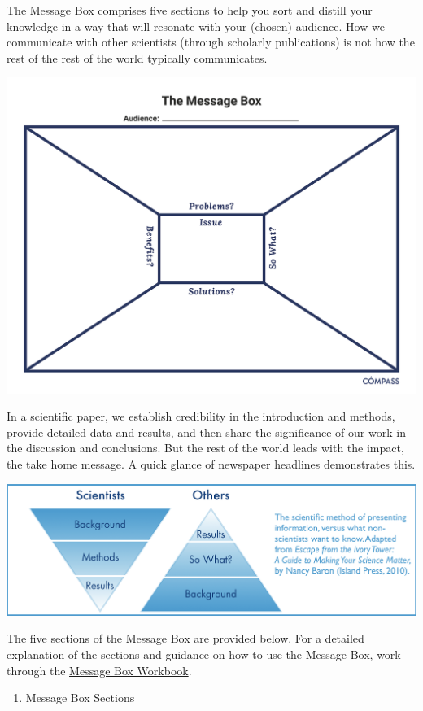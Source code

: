 \documentclass[
]{book}
\providecommand{\tightlist}{%
  \setlength{\itemsep}{0pt}\setlength{\parskip}{0pt}}
\begin{document}
The Message Box comprises five sections to help you sort and distill your knowledge in a way that will resonate with your (chosen) audience. How we communicate with other scientists (through scholarly publications) is not how the rest of the rest of the world typically communicates.

\includegraphics{images/message-box-blank.png}

In a scientific paper, we establish credibility in the introduction and methods, provide detailed data and results, and then share the significance of our work in the discussion and conclusions. But the rest of the world leads with the impact, the take home message. A quick glance of newspaper headlines demonstrates this.

\includegraphics{images/Communication.png}

The five sections of the Message Box are provided below. For a detailed explanation of the sections and guidance on how to use the Message Box, work through the \href{https://www.compassscicomm.org/wp-content/uploads/2020/05/The-Message-Box-Workbook.pdf}{Message Box Workbook}.

\begin{enumerate}
\def\labelenumi{\arabic{enumi}.}
\setcounter{enumi}{2}
\tightlist
\item
  Message Box Sections
\end{enumerate}
\end{document}
